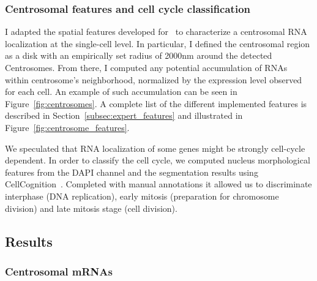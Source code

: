 \subsubsection{Centrosomal features and cell cycle classification}

I adapted the spatial features developed for~\cite{CHOUAIB_2020} to characterize a centrosomal \ac{RNA} localization at the single-cell level.
In particular, I defined the centrosomal region as a disk with an empirically set radius of 2000nm around the detected \ac{Centrosomes}.
From there, I  computed any potential accumulation of \ac{RNA}s within centrosome's neighborhood, normalized by the expression level observed for each cell.
An example of such accumulation can be seen in Figure~\ref{fig:centrosomes}.
A complete list of the different implemented features is described in Section~\ref{subsec:expert_features} and illustrated in Figure~\ref{fig:centrosome_features}.

We speculated that RNA localization of some genes might be strongly cell-cycle dependent.
In order to classify the cell cycle, we computed nucleus morphological features from the DAPI channel and the segmentation results using CellCognition~\cite{held_cellcognition_2010}.
Completed with manual annotations it allowed us to discriminate interphase (DNA replication), early mitosis (preparation for chromosome division) and late mitosis stage (cell division).

\subsection{Results}
\label{subsec:results_centrosomal}

\subsubsection{Centrosomal mRNAs}

